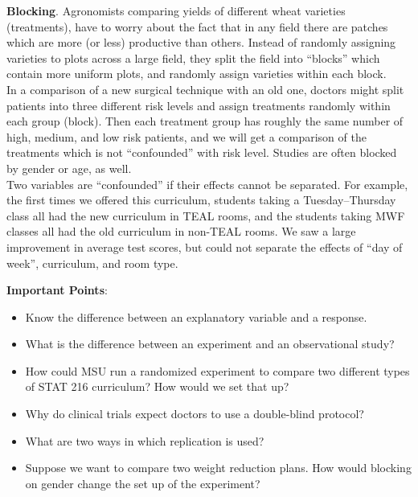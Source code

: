   {\bf Blocking}. Agronomists comparing yields of different wheat
  varieties (treatments), have to worry about the fact that in any
  field there are patches which are more (or less) productive than
  others. Instead of randomly assigning varieties to plots across a
  large field, they split the field into ``blocks'' which contain more
  uniform plots, and randomly assign varieties within each block. \\
  In a comparison of a new surgical technique with an old one, doctors
  might split patients into three different risk levels and assign
  treatments randomly within each group (block).  Then each treatment
  group has roughly the same number of high, medium, and low risk
  patients, and we will get a comparison of the treatments which is
  not ``confounded'' with risk level.  Studies are often blocked by
  gender or age, as well.\\
  Two variables are ``confounded'' if their effects cannot be
  separated.  For example, the first times we offered this curriculum,
  students taking a Tuesday--Thursday class all had the new curriculum
  in TEAL rooms, and the students taking MWF classes all had the old
  curriculum in non-TEAL rooms.  We saw a large improvement in average
  test scores, but could not separate the effects of ``day of week'',
  curriculum, and room type.


{\bf Important Points}:
\begin{itemize}
\item Know the difference between an explanatory variable and a
  response.\vfill
\item What is the difference between an experiment and an
  observational study?\vfill
\item How could MSU run a randomized experiment to compare two different
  types of STAT 216 curriculum?  How would we  set that up?\vfill
\item Why do clinical trials expect doctors to use a double-blind protocol?\vfill
\item What are two ways in which replication is used? \vfill
\item Suppose we want to compare two weight reduction plans.  How
  would blocking on gender change the set up of the experiment?    \vspace*{\fill}
\end{itemize}
